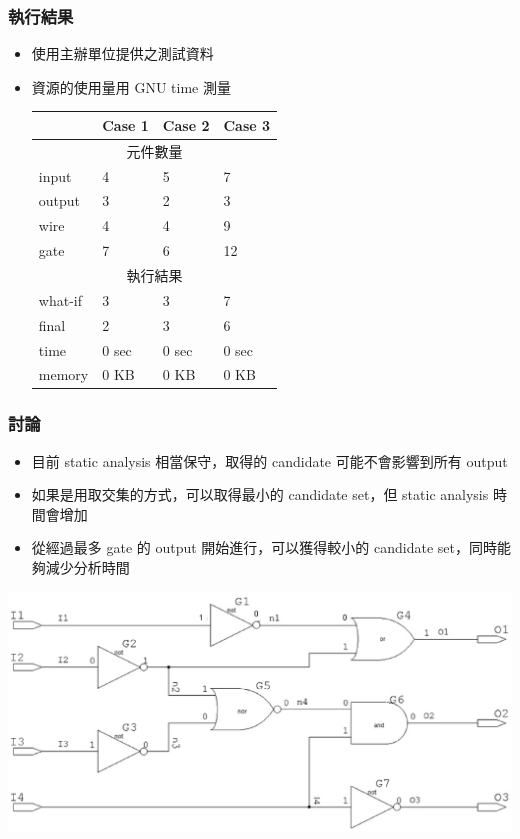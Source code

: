 \documentclass[dvipdfm]{beamer}
\begin{document}
\begin{frame}
\frametitle{執行結果}
\begin{itemize}
  \item 使用主辦單位提供之測試資料
  \item 資源的使用量用 GNU time 測量\\
    \begin{tabular}{|l|l|l|l|}
      \hline
             & Case 1 & Case 2 & Case 3\\
      \hline
      \multicolumn{4}{|c|}{元件數量}\\
      \hline
      input   & 4      & 5      & 7\\
      \hline
      output  & 3      & 2      & 3\\
      \hline
      wire    & 4      & 4      & 9\\
      \hline
      gate    & 7      & 6      & 12\\
      \hline
      \multicolumn{4}{|c|}{執行結果}\\
      \hline
      what-if & 3      & 3      & 7\\
      \hline
      final   & 2      & 3      & 6\\
      \hline
      time    & 0 sec  & 0 sec  & 0 sec\\
      \hline
      memory  & 0 KB   & 0 KB   & 0 KB\\
      \hline
    \end{tabular}
\end{itemize}
\end{frame}

\begin{frame}
\frametitle{討論}
\begin{itemize}
  \item 目前 static analysis 相當保守，取得的 candidate 可能不會影響到所有 output%
  \item 如果是用取交集的方式，可以取得最小的 candidate set，但 static analysis 時間會增加
  \item 從經過最多 gate 的 output 開始進行，可以獲得較小的 candidate set，同時能夠減少分析時間
\end{itemize}
\centerline{\includegraphics[scale=0.3]{imgs/04.eps}}
\end{frame}
\end{document}
